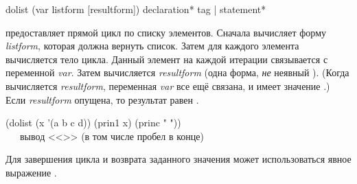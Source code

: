 \begin{defmac}
dolist (var listform [resultform])
       {declaration}* {tag | statement}*

 предоставляет прямой цикл по списку элементов.
Сначала 
вычисляет форму \emph{listform}, которая должна вернуть список.
Затем для каждого элемента вычисляется тело цикла. Данный элемент на каждой
итерации связывается с переменной \emph{var}.
Затем вычисляется \emph{resultform} (одна форма, \emph{не} неявный ).
(Когда вычисляется \emph{resultform}, переменная \emph{var} все ещё связана, и
имеет значение {\nil}.)
Если \emph{resultform} опущена, то результат равен {\false}.
\begin{lisp}
(dolist (x '(a b c d)) (prin1 x) (princ " ")) \EV\ {\false} \\
~~~\textrm{вывод <<>> (в том числе пробел в конце)}
\end{lisp}
Для завершения цикла и возврата заданного значения может использоваться явное
выражение .
\end{defmac}

